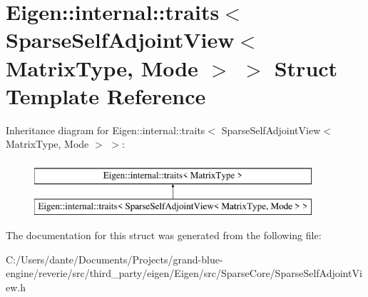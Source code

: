 \hypertarget{struct_eigen_1_1internal_1_1traits_3_01_sparse_self_adjoint_view_3_01_matrix_type_00_01_mode_01_4_01_4}{}\section{Eigen\+::internal\+::traits$<$ Sparse\+Self\+Adjoint\+View$<$ Matrix\+Type, Mode $>$ $>$ Struct Template Reference}
\label{struct_eigen_1_1internal_1_1traits_3_01_sparse_self_adjoint_view_3_01_matrix_type_00_01_mode_01_4_01_4}
Inheritance diagram for Eigen\+::internal\+::traits$<$ Sparse\+Self\+Adjoint\+View$<$ Matrix\+Type, Mode $>$ $>$\+:\begin{figure}[H]
\begin{center}
\leavevmode
\includegraphics[height=2.000000cm]{struct_eigen_1_1internal_1_1traits_3_01_sparse_self_adjoint_view_3_01_matrix_type_00_01_mode_01_4_01_4}
\end{center}
\end{figure}


The documentation for this struct was generated from the following file\+:\begin{DoxyCompactItemize}
\item 
C\+:/\+Users/dante/\+Documents/\+Projects/grand-\/blue-\/engine/reverie/src/third\+\_\+party/eigen/\+Eigen/src/\+Sparse\+Core/Sparse\+Self\+Adjoint\+View.\+h\end{DoxyCompactItemize}

